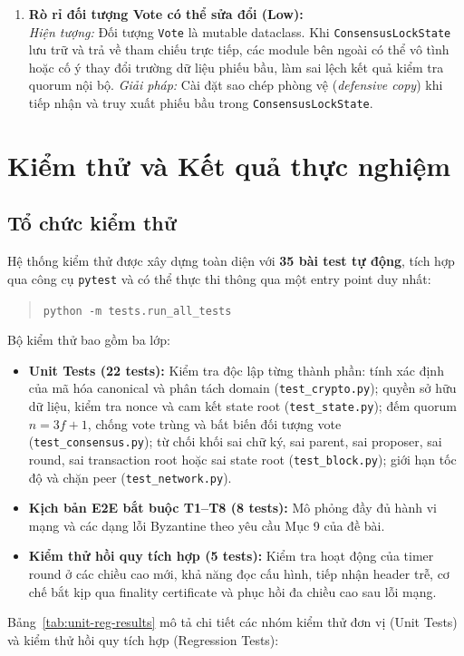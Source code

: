 \documentclass[10pt,a4paper]{report}
\begin{document}
\begin{enumerate}
  \item \textbf{Rò rỉ đối tượng Vote có thể sửa đổi (Low):}\\
  \emph{Hiện tượng:} Đối tượng \texttt{Vote} là mutable dataclass. Khi \texttt{ConsensusLockState} lưu trữ và trả về tham chiếu trực tiếp, các module bên ngoài có thể vô tình hoặc cố ý thay đổi trường dữ liệu phiếu bầu, làm sai lệch kết quả kiểm tra quorum nội bộ.
  \emph{Giải pháp:} Cài đặt sao chép phòng vệ (\emph{defensive copy}) khi tiếp nhận và truy xuất phiếu bầu trong \texttt{ConsensusLockState}.
\end{enumerate}

\chapter{Kiểm thử và Kết quả thực nghiệm}

\section{Tổ chức kiểm thử}
Hệ thống kiểm thử được xây dựng toàn diện với \textbf{35 bài test tự động}, tích hợp qua công cụ \texttt{pytest} và có thể thực thi thông qua một entry point duy nhất:
\begin{quote}
\texttt{python -m tests.run\_all\_tests}
\end{quote}
Bộ kiểm thử bao gồm ba lớp:
\begin{itemize}
  \item \textbf{Unit Tests (22 tests):} Kiểm tra độc lập từng thành phần: tính xác định của mã hóa canonical và phân tách domain (\texttt{test\_crypto.py}); quyền sở hữu dữ liệu, kiểm tra nonce và cam kết state root (\texttt{test\_state.py}); đếm quorum $n = 3f + 1$, chống vote trùng và bất biến đối tượng vote (\texttt{test\_consensus.py}); từ chối khối sai chữ ký, sai parent, sai proposer, sai round, sai transaction root hoặc sai state root (\texttt{test\_block.py}); giới hạn tốc độ và chặn peer (\texttt{test\_network.py}).
  \item \textbf{Kịch bản E2E bắt buộc T1--T8 (8 tests):} Mô phỏng đầy đủ hành vi mạng và các dạng lỗi Byzantine theo yêu cầu Mục 9 của đề bài.
  \item \textbf{Kiểm thử hồi quy tích hợp (5 tests):} Kiểm tra hoạt động của timer round ở các chiều cao mới, khả năng đọc cấu hình, tiếp nhận header trễ, cơ chế bắt kịp qua finality certificate và phục hồi đa chiều cao sau lỗi mạng.
\end{itemize}
Bảng~\ref{tab:unit-reg-results} mô tả chi tiết các nhóm kiểm thử đơn vị (Unit Tests) và kiểm thử hồi quy tích hợp (Regression Tests):
\end{document}
